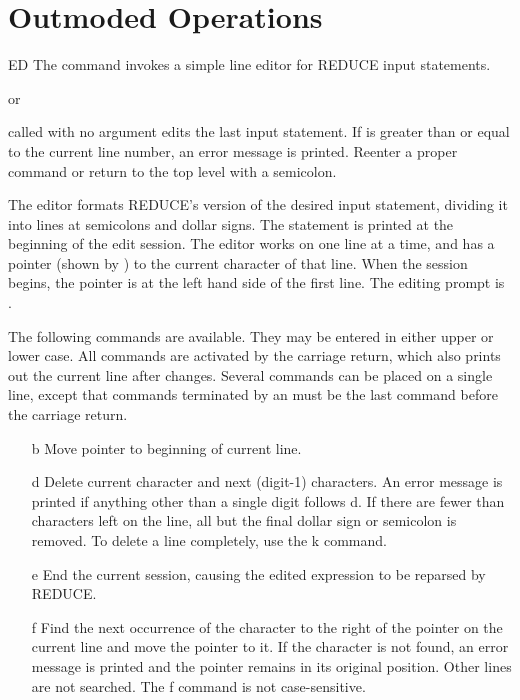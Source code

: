\section{Outmoded Operations}

\begin{Command}{ED}
The  command invokes a simple line editor for REDUCE input
statements.

\begin{Syntax}
  or 
\end{Syntax}

 called with no argument edits the last input statement.  If
 is greater than or equal to the current line number, an error
message is printed.  Reenter a proper  command or return to the
top level with a semicolon.

The editor formats REDUCE's version of the desired input statement,
dividing it into lines at semicolons and dollar signs.  The statement is 
printed at the beginning of the edit session.  The editor works on one
line at a time, and has a pointer (shown by \name{^}) to the current
character of that line.  When the session begins, the pointer is at the
left hand side of the first line.  The editing prompt is \name{>}.

The following commands are available.  They may be entered in either upper
or lower case.  All commands are activated by the carriage return, which
also prints out the current line after changes.  Several commands can be
placed on a single line, except that commands terminated by an 
must be the last command before the carriage return.

\begin{itemize}
\item[b]
Move pointer to beginning of current line.

\item[d\meta{digit}]
Delete current character and next (digit-1) characters.  An error message
is printed if anything other than a single digit follows d.  If there are
fewer than  characters left on the line, all but the final
dollar sign or semicolon is removed.  To delete a line completely, use the
k command.

\item[e]
End the current session, causing the edited expression to be reparsed by
REDUCE.

\item[f\meta{char}]
Find the next occurrence of the character  to the right of the
pointer on the current line and move the pointer to it. If the character is
not found, an error message is printed and the pointer remains in its
original position.  Other lines are not searched.  The f command is not
case-sensitive.


\end{itemize}
\end{Command}
